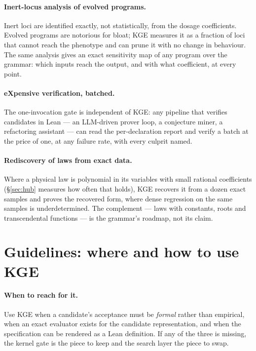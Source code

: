 \documentclass[11pt,a4paper]{article}
\theoremstyle{definition}
\theoremstyle{remark}
\begin{document}
\paragraph{Inert-locus analysis of evolved programs.} Inert loci are identified
exactly, not statistically, from the dosage coefficients. Evolved programs are
notorious for bloat; KGE measures it as a fraction of loci that cannot reach the
phenotype and can prune it with no change in behaviour. The same analysis gives
an exact sensitivity map of any program over the grammar: which inputs reach the
output, and with what coefficient, at every point.

\paragraph{eXpensive verification, batched.} The one-invocation gate is
independent of KGE: any pipeline that verifies candidates in Lean --- an
LLM-driven prover loop, a conjecture miner, a refactoring assistant --- can read
the per-declaration report and verify a batch at the price of one, at any
failure rate, with every culprit named.

\paragraph{Rediscovery of laws from exact data.} Where a physical law is
polynomial in its variables with small rational coefficients (\S\ref{sec:hub}
measures how often that holds), KGE recovers it from a dozen exact samples and
proves the recovered form, where dense regression on the same samples is
underdetermined. The complement --- laws with constants, roots and transcendental
functions --- is the grammar's roadmap, not its claim.

\section{Guidelines: where and how to use KGE}\label{sec:guidelines}

\paragraph{When to reach for it.} Use KGE when a candidate's acceptance must be
\emph{formal} rather than empirical, when an exact evaluator exists for the
candidate representation, and when the specification can be rendered as a Lean
definition. If any of the three is missing, the kernel gate is the piece to keep
and the search layer the piece to swap.
\end{document}

